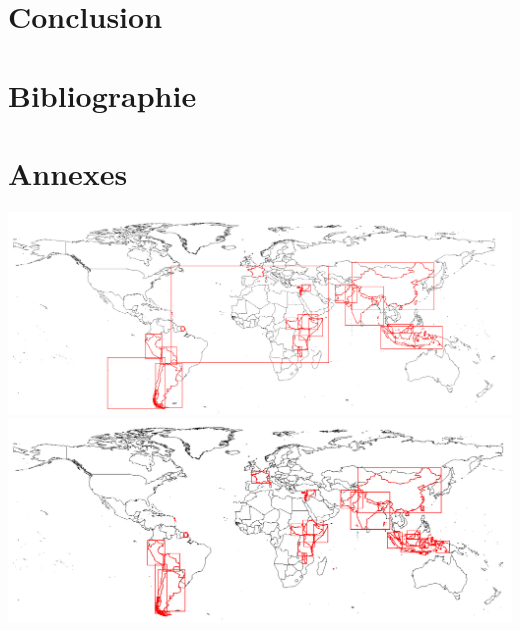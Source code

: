 \documentclass[utf8]{article}
\begin{document}
\begin{large}
\section{Conclusion}
\indent
\par
\par

\section{Bibliographie}

\section{Annexes}
\includegraphics[width=\textwidth]{beforeopti.png}
\includegraphics[width=\textwidth]{afterOpti.png}


\end{large}
\end{document}
